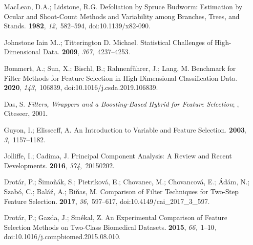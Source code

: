 \documentclass[remotesensing,article,accept,moreauthors,pdftex]{Definitions/mdpi}
\begin{document}
\begin{thebibliography}{999}
MacLean, D.A.; Lidstone, R.G.
\newblock Defoliation by Spruce Budworm: Estimation by Ocular and Shoot-Count
  Methods and Variability among Branches, Trees, and Stands.
 {\bf 1982}, {\em
  12},~582--594, doi:10.1139/x82-090.

{Johnstone Iain M.}.; {Titterington D. Michael}.
\newblock Statistical Challenges of High-Dimensional Data.
 {\bf 2009}, {\em 367},~4237--4253.

Bommert, A.; Sun, X.; Bischl, B.; Rahnenf{\"u}hrer, J.; Lang, M.
\newblock Benchmark for Filter Methods for Feature Selection in
  High-Dimensional Classification Data.
 {\bf 2020}, {\em
  143},~106839, doi:10.1016/j.csda.2019.106839.

Das, S.
\newblock \emph{Filters, {{Wrappers}} and a {{Boosting}}-{{Based Hybrid}} for
  {{Feature Selection}}};
, Citeseer, 2001.

Guyon, I.; Elisseeff, A.
\newblock An Introduction to Variable and Feature Selection.
 {\bf 2003}, {\em
  3},~1157--1182.

Jolliffe, I.; Cadima, J.
\newblock Principal Component Analysis: A Review and Recent Developments.
 {\bf 2016}, {\em 374},~20150202.

Drot{\'a}r, P.; {\v S}imo{\v n}{\'a}k, S.; Pietrikov{\'a}, E.; Chovanec, M.;
  Chovancov{\'a}, E.; {\'A}d{\'a}m, N.; Szab{\'o}, C.; Bal{\'a}{\v z}, A.;
  Bi{\v n}as, M.
\newblock Comparison of {{Filter Techniques}} for {{Two}}-{{Step Feature
  Selection}}.
 {\bf 2017}, {\em 36},~597--617, doi:10.4149/cai\_2017\_3\_597.

Drot{\'a}r, P.; Gazda, J.; Sm{\'e}kal, Z.
\newblock An Experimental Comparison of Feature Selection Methods on Two-Class
  Biomedical Datasets.
 {\bf 2015}, {\em 66},~1--10, doi:10.1016/j.compbiomed.2015.08.010.


\end{thebibliography}
\end{document}
